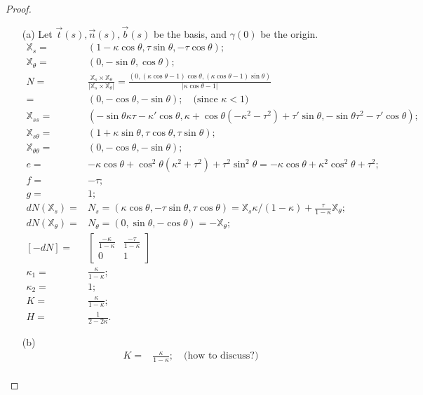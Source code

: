 \documentclass[10pt,a4paper]{article}
\begin{document}
\begin{proof}
\begin{enumerate}
\item[(a)] 
Let $\vec{t}(s), \vec{n}(s), \vec{b}(s)$ be the basis, and $\gamma(0)$ be the origin.
\begin{align*}
\mathbb{X}_{s} =& (1 - \kappa\cos\theta, \tau\sin\theta, -\tau\cos\theta); \\
\mathbb{X}_{\theta} =& (0, -\sin\theta, \cos\theta); \\
N =& \frac{\mathbb{X}_{s} \times \mathbb{X}_{\theta}}{|\mathbb{X}_{s} \times \mathbb{X}_{\theta}|} = \frac{(0, (\kappa\cos\theta - 1)\cos\theta, (\kappa\cos\theta - 1)\sin\theta)}{|\kappa\cos\theta - 1|} \\
  =& (0, -\cos\theta, -\sin\theta); \quad\text{(since $\kappa< 1$)} \\
\mathbb{X}_{ss} =& (-\sin\theta\kappa\tau - \kappa'\cos\theta, \kappa + \cos\theta(-\kappa^2 - \tau^2) + \tau'\sin\theta, -\sin\theta\tau^2 - \tau'\cos\theta); \\
\mathbb{X}_{s\theta} =& (1 + \kappa\sin\theta, \tau\cos\theta, \tau\sin\theta); \\
\mathbb{X}_{\theta\theta} =& (0, -\cos\theta, -\sin\theta); \\
e =& -\kappa\cos\theta + \cos^2\theta(\kappa^2 + \tau^2) + \tau^2\sin^2\theta = -\kappa\cos\theta + \kappa^2\cos^2\theta + \tau^2; \\
f =& -\tau; \\
g =& 1; \\
dN(\mathbb{X}_{s}) =& N_{s} = (\kappa\cos\theta, -\tau\sin\theta, \tau\cos\theta) = \mathbb{X}_{s}\kappa/(1-\kappa) + \frac{\tau}{1-\kappa}\mathbb{X}_{\theta}; \\
dN(\mathbb{X}_{\theta}) =& N_{\theta} = (0, \sin\theta, -\cos\theta) = -\mathbb{X}_{\theta}; \\
[-dN] =& \left[\begin{array}{cc} \frac{-\kappa}{1-\kappa} & \frac{-\tau}{1-\kappa} \\ 0  & 1\end{array}\right] \\
\kappa_1 =& \frac{\kappa}{1 - \kappa}; \\
\kappa_2 =& 1; \\
K =& \frac{\kappa}{1 - \kappa}; \\
H =& \frac{1}{2 - 2\kappa}.
\end{align*}
\item[(b)] 
\begin{align*}
K =& \frac{\kappa}{1 - \kappa}; \quad\text{(how to discuss?)}\\
\end{align*}
\end{enumerate}
\end{proof}
\end{document}
